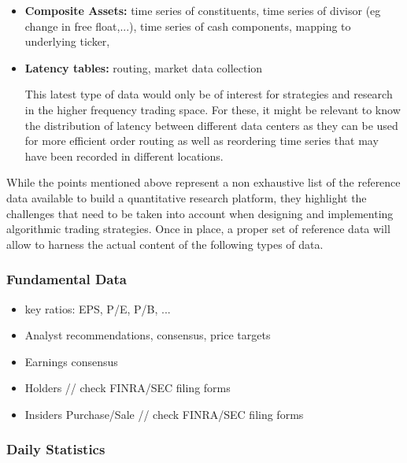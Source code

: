 \begin{itemize}
\item \textbf{Composite Assets:} time series of constituents, time series of divisor (eg change in free float,...), time series of cash components, mapping to underlying ticker, 


\item \textbf{Latency tables:} routing, market data collection

This latest type of data would only be of interest for strategies and research in the higher frequency trading space. For these, it might be relevant to know the distribution of latency between different data centers as they can be used for more efficient order routing as well as reordering time series that may have been recorded in different locations.

\end{itemize}

While the points mentioned above represent a non exhaustive list of the reference data available to build a quantitative research platform, they highlight the challenges that need to be taken into account when designing and implementing algorithmic trading strategies. Once in place, a proper set of reference data will allow to harness the actual content of the following types of data.

\subsubsection{Fundamental Data}

\begin{itemize}
\item key ratios: EPS, P/E, P/B, ...
\item Analyst recommendations, consensus, price targets
\item Earnings consensus
\item Holders // check FINRA/SEC filing forms
\item Insiders Purchase/Sale // check FINRA/SEC filing forms
\end{itemize}

\subsubsection{Daily Statistics}

